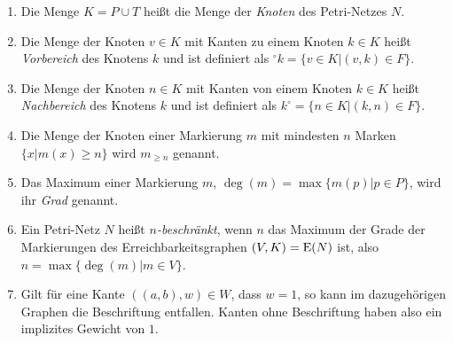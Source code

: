 \begin{enumerate}
	\item Die Menge $K = P\cup T$ heißt die Menge der \emph{Knoten} des Petri-Netzes $N$.
	\item Die Menge der Knoten $v \in K$ mit Kanten zu einem Knoten $k \in K$ heißt \emph{Vorbereich} des Knotens $k$ und ist definiert als $^\circ k = \{v \in K| (v,k) \in F\}$.
	\item Die Menge der Knoten $n \in K$ mit Kanten von einem Knoten $k \in K$ heißt \emph{Nachbereich} des Knotens $k$ und ist definiert als $k^\circ  = \{n \in K | (k,n) \in F\}$.
	\item Die Menge der Knoten einer Markierung $m$ mit mindesten $n$ Marken $\{x | m(x)\geq n\}$ wird $m_{\geq n}$ genannt.
	\item Das Maximum einer Markierung $m$, $\deg(m) = \max \{m(p)|p\in P\}$, wird ihr \emph{Grad} genannt.
	\item Ein Petri-Netz $N$ heißt \emph{$n$-beschränkt}, wenn $n$ das Maximum der Grade der Markierungen des Erreichbarkeitsgraphen $(V,K)=\operatorname{E}(N)$ ist, also $n = \max\{\deg(m)| m\in V \}$.
	\item Gilt für eine Kante $((a, b),w) \in W$, dass $w = 1$, so kann im dazugehörigen Graphen die Beschriftung entfallen. Kanten ohne Beschriftung haben also ein implizites Gewicht von $1$.
\end{enumerate}



